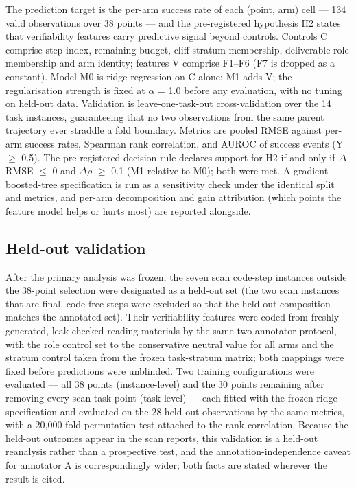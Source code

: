 The prediction target is the per-arm success rate of each (point, arm) cell --- 134 valid observations over 38 points --- and the pre-registered hypothesis H2 states that verifiability features carry predictive signal beyond controls. Controls C comprise step index, remaining budget, cliff-stratum membership, deliverable-role membership and arm identity; features V comprise F1--F6 (F7 is dropped as a constant). Model M0 is ridge regression on C alone; M1 adds V; the regularisation strength is fixed at $\alpha$ = 1.0 before any evaluation, with no tuning on held-out data. Validation is leave-one-task-out cross-validation over the 14 task instances, guaranteeing that no two observations from the same parent trajectory ever straddle a fold boundary. Metrics are pooled RMSE against per-arm success rates, Spearman rank correlation, and AUROC of success events (Y $\geq$ 0.5). The pre-registered decision rule declares support for H2 if and only if $\Delta$RMSE $\leq$ 0 and $\Delta$$\rho$ $\geq$ 0.1 (M1 relative to M0); both were met. A gradient-boosted-tree specification is run as a sensitivity check under the identical split and metrics, and per-arm decomposition and gain attribution (which points the feature model helps or hurts most) are reported alongside.

\subsection*{Held-out validation}

After the primary analysis was frozen, the seven scan code-step instances outside the 38-point selection were designated as a held-out set (the two scan instances that are final, code-free steps were excluded so that the held-out composition matches the annotated set). Their verifiability features were coded from freshly generated, leak-checked reading materials by the same two-annotator protocol, with the role control set to the conservative neutral value for all arms and the stratum control taken from the frozen task-stratum matrix; both mappings were fixed before predictions were unblinded. Two training configurations were evaluated --- all 38 points (instance-level) and the 30 points remaining after removing every scan-task point (task-level) --- each fitted with the frozen ridge specification and evaluated on the 28 held-out observations by the same metrics, with a 20,000-fold permutation test attached to the rank correlation. Because the held-out outcomes appear in the scan reports, this validation is a held-out reanalysis rather than a prospective test, and the annotation-independence caveat for annotator A is correspondingly wider; both facts are stated wherever the result is cited.

